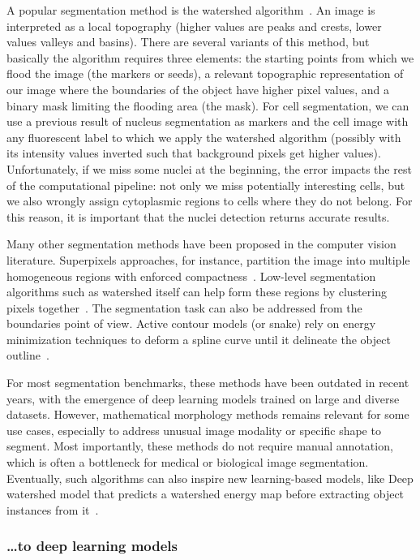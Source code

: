 A popular segmentation method is the watershed algorithm~\cite{Vincent_1991}.
An image is interpreted as a local topography (higher values are peaks and crests, lower values valleys and basins).
There are several variants of this method, but basically the algorithm requires three elements: the starting points from which we flood the image (the markers or seeds), a relevant topographic representation of our image where the boundaries of the object have higher pixel values, and a binary mask limiting the flooding area (the mask).
For cell segmentation, we can use a previous result of nucleus segmentation as markers and the cell image with any fluorescent label to which we apply the watershed algorithm (possibly with its intensity values inverted such that background pixels get higher values).
Unfortunately, if we miss some nuclei at the beginning, the error impacts the rest of the computational pipeline: not only we miss potentially interesting cells, but we also wrongly assign cytoplasmic regions to cells where they do not belong.
For this reason, it is important that the nuclei detection returns accurate results.

Many other segmentation methods have been proposed in the computer vision literature.
Superpixels approaches, for instance, partition the image into multiple homogeneous regions with enforced compactness~\cite{Ren_2003}.
Low-level segmentation algorithms such as watershed itself can help form these regions by clustering pixels together~\cite{Machairas_2014}.
The segmentation task can also be addressed from the boundaries point of view.
Active contour models (or snake) rely on energy minimization techniques to deform a spline curve until it delineate the object outline~\cite{kass_snakes_1988}.

For most segmentation benchmarks, these methods have been outdated in recent years, with the emergence of deep learning models trained on large and diverse datasets.
However, mathematical morphology methods remains relevant for some use cases, especially to address unusual image modality or specific shape to segment.
Most importantly, these methods do not require manual annotation, which is often a bottleneck for medical or biological image segmentation.
Eventually, such algorithms can also inspire new learning-based models, like Deep watershed model that predicts a watershed energy map before extracting object instances from it~\cite{Bai_2017_CVPR}.

\subsubsection{\dots to deep learning models}

